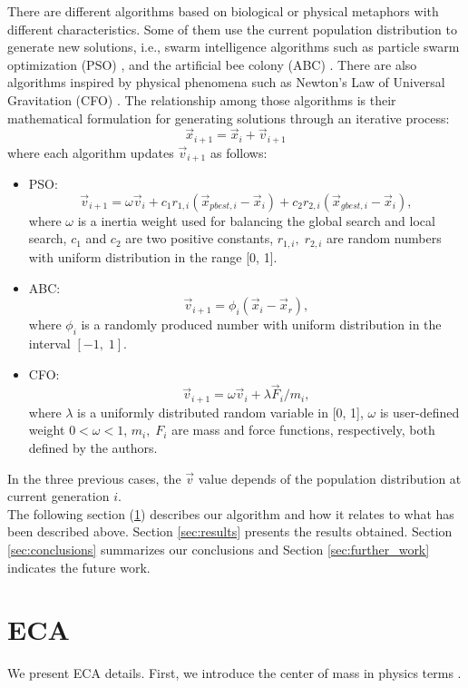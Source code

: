 \documentclass[graybox]{svmult}
\begin{document}
There are different algorithms based on biological or physical metaphors with 
different characteristics. Some of them use the current population distribution 
to generate new solutions, i.e., swarm intelligence algorithms such as particle 
swarm optimization (PSO) \cite{pso1995}, and the artificial bee colony (ABC) \cite{abc2005}. 
There are also algorithms inspired by physical phenomena such as Newton's Law of 
Universal Gravitation (CFO) \cite{fisicaSurvey, cfo2007}. The relationship among those  
algorithms  is their mathematical formulation for generating solutions 
through an iterative process:
%
\begin{equation}
	\vec{x}_{i + 1} = \vec{x}_{i} + \vec{v}_{i + 1}
	\label{eqn:xxv}
\end{equation}
%
where each algorithm updates $\vec{v}_{i+1} $ as follows:
\begin{itemize}
	\item PSO:
		$$
			\vec{v}_{i + 1} = \omega \vec{v}_{i} +  
					c_1 r_{1, i} ( \vec{x}_{pbest, i} - \vec{x}_i ) + 
					c_2 r_{2, i} ( \vec{x}_{gbest, i} - \vec{x}_i ),
		$$
		where $\omega$ is a inertia weight used for balancing the global search 
		and local search, $c_1$ and $c_2$ are two positive constants, $r_{1, i},\; r_{2, i}$ 
		are random numbers with uniform distribution in the range [0, 1].
	\item ABC:
		$$
			\vec{v}_{i + 1} = \phi_i (\vec{x}_i - \vec{x}_{r}),
		$$
	where $\phi_i$ is a randomly produced number with uniform distribution 
	in the interval $[-1,\;1]$.
	\item CFO: $$
		\vec{v}_{i + 1} = \omega \vec{v}_{i} + {\lambda \vec{F}_{i}} / {m_i},
		$$
		where $\lambda$ is a uniformly distributed random variable in [0, 1], $\omega$ 
		is user-defined weight $0 < \omega < 1$, $m_i,\; F_i$ are mass and force 
		functions, respectively, both defined by the authors.
\end{itemize}
%
%
In the three previous cases, the $\vec{v}$ value  depends of the population 
distribution at current generation $i$.\\

The following section (\ref{sec:eca}) describes our algorithm and how it 
relates to what has been  described above. Section \ref{sec:results} 
presents the results obtained.  Section \ref{sec:conclusions} summarizes 
our conclusions and Section \ref{sec:further_work}  indicates the future work. 

\section{ECA} %
\label{sec:eca}
%
%
We present ECA details. First, we introduce the center of mass in physics 
terms \cite{kleppner73,serway}.
\end{document}
